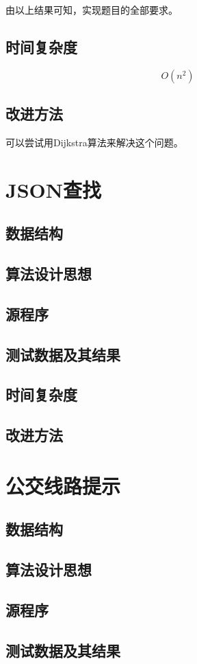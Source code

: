 \documentclass[a4paper,11pt,UTF8]{ctexart}
\begin{document}
    由以上结果可知，实现题目的全部要求。

\subsection{时间复杂度}
$$
O(n^2)
$$
\subsection{改进方法}
可以尝试用Dijkstra算法来解决这个问题。
\section{JSON查找}

\subsection{数据结构}
\subsection{算法设计思想}
\subsection{源程序}
\subsection{测试数据及其结果}
\subsection{时间复杂度}
\subsection{改进方法}

\section{公交线路提示}
\subsection{数据结构}
\subsection{算法设计思想}
\subsection{源程序}
\subsection{测试数据及其结果}
\end{document}
